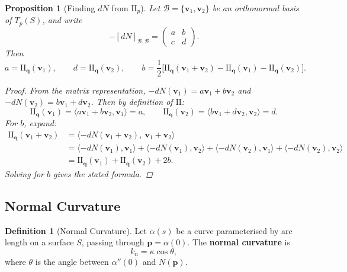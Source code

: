 \documentclass[10pt, a4paper]{article}
\theoremstyle{plain}
\newtheorem{proposition}[theorem]{Proposition}
\theoremstyle{definition}
\newtheorem{definition}[theorem]{Definition}
\theoremstyle{remark}
\begin{document}
\begin{proposition}[Finding $dN$ from $\mathrm{II}_p$]
  Let $\mathcal{B} = \{\mathbf{v}_1, \mathbf{v}_2\}$ be an orthonormal basis of $T_p(S)$, and write
  \[
    -[dN]_{\mathcal{B},\mathcal{B}} = \begin{pmatrix} a & b \\ c & d \end{pmatrix}.
  \]
  Then
  \[
    a = \mathrm{II}_{\mathbf{q}}(\mathbf{v}_1), \qquad
    d = \mathrm{II}_{\mathbf{q}}(\mathbf{v}_2), \qquad
    b = \frac{1}{2}\Big[\mathrm{II}_{\mathbf{q}}(\mathbf{v}_1 + \mathbf{v}_2)
        - \mathrm{II}_{\mathbf{q}}(\mathbf{v}_1) - \mathrm{II}_{\mathbf{q}}(\mathbf{v}_2)\Big].
  \]

\begin{proof}
  From the matrix representation, $-dN(\mathbf{v}_1) = a\mathbf{v}_1 + b\mathbf{v}_2$ and
  $-dN(\mathbf{v}_2) = b\mathbf{v}_1 + d\mathbf{v}_2$. Then by definition of $\mathrm{II}$:
  \[
    \mathrm{II}_{\mathbf{q}}(\mathbf{v}_1)
    = \langle a\mathbf{v}_1 + b\mathbf{v}_2, \mathbf{v}_1 \rangle = a, \qquad
    \mathrm{II}_{\mathbf{q}}(\mathbf{v}_2)
    = \langle b\mathbf{v}_1 + d\mathbf{v}_2, \mathbf{v}_2 \rangle = d.
  \]
  For $b$, expand:
  \begin{align*}
    \mathrm{II}_{\mathbf{q}}(\mathbf{v}_1 + \mathbf{v}_2)
    &= \langle -dN(\mathbf{v}_1 + \mathbf{v}_2),\ \mathbf{v}_1 + \mathbf{v}_2 \rangle \\
    &= \langle -dN(\mathbf{v}_1), \mathbf{v}_1 \rangle
     + \langle -dN(\mathbf{v}_1), \mathbf{v}_2 \rangle
     + \langle -dN(\mathbf{v}_2), \mathbf{v}_1 \rangle
     + \langle -dN(\mathbf{v}_2), \mathbf{v}_2 \rangle \\
    &= \mathrm{II}_{\mathbf{q}}(\mathbf{v}_1) + \mathrm{II}_{\mathbf{q}}(\mathbf{v}_2) + 2b.
  \end{align*}
  Solving for $b$ gives the stated formula.
\end{proof}

\end{proposition}


\subsection{Normal Curvature}

\begin{definition}[Normal Curvature]{\label{def:normalcurve}}
  Let $\alpha(s)$ be a curve parameterised by arc length on a surface $S$, passing through
  $\mathbf{p} = \alpha(0)$. The \textbf{normal curvature} is
  \[
    k_n = \kappa \cos\theta,
  \]
  where $\theta$ is the angle between $\alpha''(0)$ and $N(\mathbf{p})$.
\end{definition}
\end{document}
